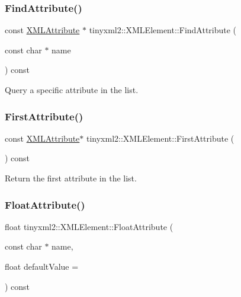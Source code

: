 \subsubsection{\texorpdfstring{Find\+Attribute()}{FindAttribute()}}
{\footnotesize\ttfamily const \hyperlink{classtinyxml2_1_1_x_m_l_attribute}{X\+M\+L\+Attribute} $\ast$ tinyxml2\+::\+X\+M\+L\+Element\+::\+Find\+Attribute (\begin{DoxyParamCaption}\item[{const char $\ast$}]{name }\end{DoxyParamCaption}) const}



Query a specific attribute in the list. 

\mbox{\label{classtinyxml2_1_1_x_m_l_element_a3e191704c8d499906ec11fe2f60c6686}} 
\subsubsection{\texorpdfstring{First\+Attribute()}{FirstAttribute()}}
{\footnotesize\ttfamily const \hyperlink{classtinyxml2_1_1_x_m_l_attribute}{X\+M\+L\+Attribute}$\ast$ tinyxml2\+::\+X\+M\+L\+Element\+::\+First\+Attribute (\begin{DoxyParamCaption}{ }\end{DoxyParamCaption}) const\hspace{0.3cm}{\ttfamily [inline]}}



Return the first attribute in the list. 

\mbox{\label{classtinyxml2_1_1_x_m_l_element_ab1f4be2332e27dc640e9b6abd01d64dd}} 
\subsubsection{\texorpdfstring{Float\+Attribute()}{FloatAttribute()}}
{\footnotesize\ttfamily float tinyxml2\+::\+X\+M\+L\+Element\+::\+Float\+Attribute (\begin{DoxyParamCaption}\item[{const char $\ast$}]{name,  }\item[{float}]{default\+Value = {} }\end{DoxyParamCaption}) const}



